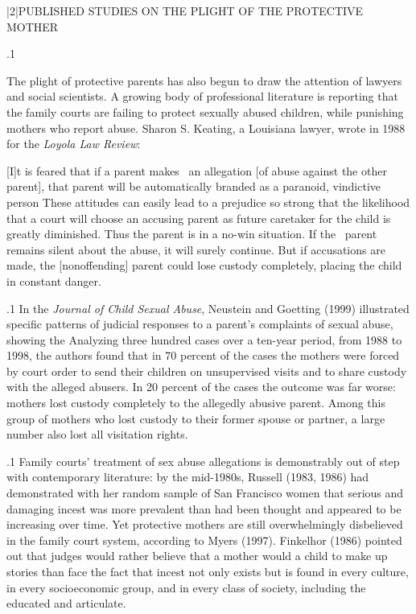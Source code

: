 \documentclass[11pt, twoside]{article}
\begin{document}
{\s|2|{PUBLISHED STUDIES ON THE PLIGHT OF THE PROTECTIVE MOTHER}

\p.1{%
\noindent{}The plight of protective parents has also begun to draw the attention of
lawyers and social scientists. A growing body of professional literature
is reporting that the family courts are failing to protect sexually abused
children, while punishing mothers who report abuse. Sharon S. Keating,
a Louisiana lawyer, wrote in 1988 for the \textit{Loyola Law Review}:

\begin{blockQuote}
{[I]}t is feared that if a parent makes \ellThree{2pt}{2pt}\ an allegation [of abuse against
the other parent], that parent will be automatically bran\-ded as a
paranoid, vindictive person\ellFour{2pt}{2pt} These attitudes can easily lead to
a prejudice so strong that the likelihood that a court will choose
an accusing parent as future caretaker for the child is greatly diminished. Thus the parent is in a no-win situation. If the \ellThree{2pt}{2pt}\ parent
remains silent about the abuse, it will surely continue. But if accusations are made, the [nonoffending] parent could lose custody
completely, placing the child in constant danger.
\end{blockQuote}

}%

\p.1{%
In the \textit{Journal of Child Sexual Abuse}, Neustein and Goetting (1999)
illustrated specific patterns of judicial responses to a 
parent’s complaints of sexual abuse, showing the  Analyzing three hundred cases over a ten-year period, from
1988 to 1998, the authors found that in 70 percent of the cases the
mothers were forced by court order to send their children on unsupervised visits and to share custody with the alleged abusers. In 20 percent
of the cases the outcome was far worse: mothers lost custody completely
to the allegedly abusive parent. Among this group of mothers who lost
custody to their former spouse or partner, a large number also lost all
visitation rights.
}%

\p.1{%
Family courts’ treatment of sex abuse allegations is demonstrably
out of step with contemporary literature: by the mid-1980s, Russell
(1983, 1986) had demonstrated with her random sample of San Francisco women that serious and damaging incest was more prevalent than
had been thought and appeared to be increasing over time. Yet protective mothers are still overwhelmingly disbelieved in the family court
system, according to Myers (1997). Finkelhor (1986) pointed out that
judges would rather believe that a mother would  a child to
make up stories than face the fact that incest not only exists but is found
in every culture, in every socioeconomic group, and in every class of
society, including the educated and articulate.
}%

}
\end{document}
